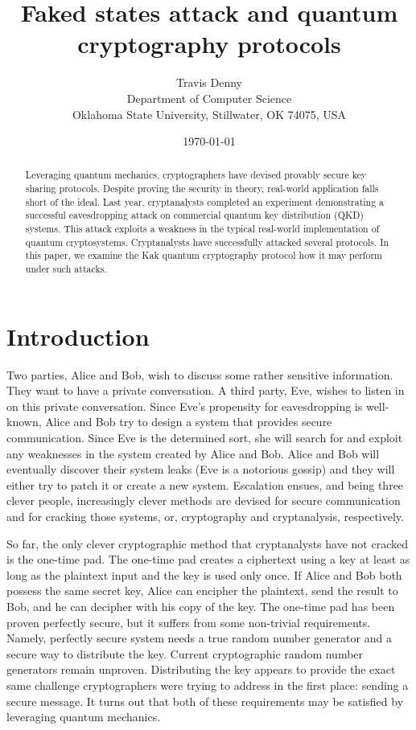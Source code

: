 \documentclass[12pt,twocolumn]{article}
\author{Travis Denny\\
Department of Computer Science\\
Oklahoma State University, Stillwater, OK 74075, USA}
\title{Faked states attack and quantum cryptography protocols}
\date{\today}
\begin{document}
\maketitle
\begin{abstract}
Leveraging quantum mechanics, cryptographers have devised provably secure key sharing protocols\cite{bennett:84,bennett:92,ekert:91,scarani:04}. Despite proving the security in theory, real-world application falls short of the ideal. Last year, cryptanalysts completed an experiment demonstrating a successful eavesdropping attack on commercial quantum key distribution (QKD) systems\cite{lyderson:10}. This attack exploits a weakness in the typical real-world implementation of quantum cryptosystems. Cryptanalysts have successfully attacked several protocols\cite{gerhardt:11}. In this paper, we examine the Kak quantum cryptography protocol\cite{kak:06} how it may perform under such attacks.
\end{abstract}
\section{Introduction}
Two parties, Alice and Bob, wish to discuss some rather sensitive information. They want to have a private conversation. A third party, Eve, wishes to listen in on this private conversation. Since Eve's propensity for eavesdropping is well-known, Alice and Bob try to design a system that provides secure communication. Since Eve is the determined sort, she will search for and exploit any weaknesses in the system created by Alice and Bob. Alice and Bob will eventually discover their system leaks (Eve is a notorious gossip) and they will either try to patch it or create a new system. Escalation ensues, and being three clever people, increasingly clever methods are devised for secure communication and for cracking those systems, or, cryptography and cryptanalysis, respectively.

So far, the only clever cryptographic method that cryptanalysts have not cracked is the one-time pad. The one-time pad creates a ciphertext using a key at least as long as the plaintext input and the key is used only once. If Alice and Bob both possess the same secret key, Alice can encipher the plaintext, send the result to Bob, and he can decipher with his copy of the key. The one-time pad has been proven perfectly secure\cite{shannon:49}, but it suffers from some non-trivial requirements. Namely, perfectly secure system needs a true random number generator and a secure way to distribute the key. Current cryptographic random number generators remain unproven. Distributing the key appears to provide the exact same challenge cryptographers were trying to address in the first place: sending a secure message. It turns out that both of these requirements may be satisfied by leveraging quantum mechanics.
\end{document}
